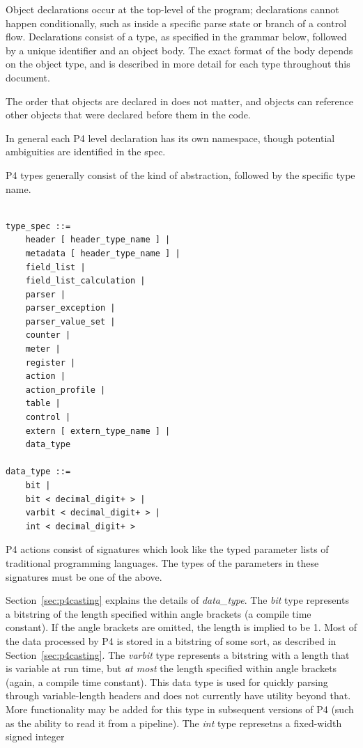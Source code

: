 \documentclass[12pt]{article}
\begin{document}
Object declarations occur at the top-level of the program; declarations cannot 
happen conditionally, such as inside a specific parse state or branch of a 
control flow. Declarations consist of a type, as specified in the grammar below, 
followed by a unique identifier and an object body. The exact format of the 
body depends on the object type, and is described in more detail for each type 
throughout this document.

The order that objects are declared in does not matter, and objects can
reference other objects that were declared before them in the code.

In general each P4 level declaration has its own namespace, though 
potential ambiguities are identified in the spec.

P4 types generally consist of the kind of abstraction, followed by the specific
type name.


\begin{lstlisting}[style=BNFstyle]

type_spec ::=
    header [ header_type_name ] |
    metadata [ header_type_name ] |
    field_list |
    field_list_calculation |
    parser |
    parser_exception |
    parser_value_set |
    counter |
    meter |
    register |
    action |
    action_profile |
    table |
    control |
    extern [ extern_type_name ] |
    data_type

data_type ::=
    bit |
    bit < decimal_digit+ > |
    varbit < decimal_digit+ > |
    int < decimal_digit+ >
\end{lstlisting}

P4 actions consist of signatures which look like the typed
parameter lists of traditional programming languages. The types of the
parameters in these signatures must be one of the above.

Section~\ref{sec:p4casting} explains the details of \textit{data_type}.
The \textit{bit} type represents a bitstring of the length specified within
angle brackets (a compile time constant). If the angle brackets are omitted, the
length is implied to be 1. Most of the data processed by P4 is stored in a
bitstring of some sort, as described in Section~\ref{sec:p4casting}.
The \textit{varbit} type represents a bitstring with a length that is variable
at run time, but \textit{at most} the length specified within angle brackets
(again, a compile time constant). This data type is used for quickly parsing
through variable-length headers and does not currently have utility beyond
that. More functionality may be added for this type in subsequent versions of P4
(such as the ability to read it from a \matchaction pipeline).
The \textit{int} type represetns a fixed-width signed integer
\end{document}
